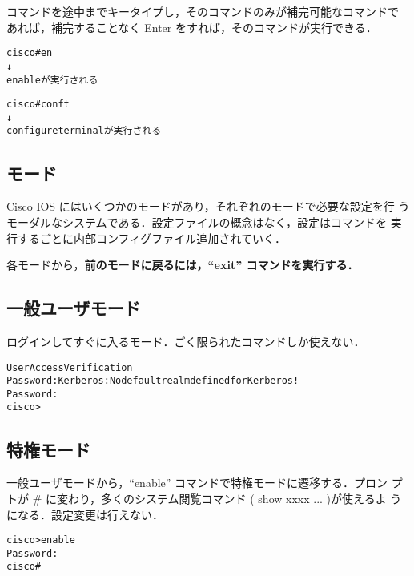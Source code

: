 コマンドを途中までキータイプし，そのコマンドのみが補完可能なコマンドで
あれば，補完することなく Enter をすれば，そのコマンドが実行できる．

\begin{center}
\begin{screen}
\begin{alltt}
cisco#en
       ↓
    enableが実行される

cisco#conf t
       ↓
   configure terminal が実行される
\end{alltt}
\end{screen}
\end{center}

\subsection*{モード}

Cisco IOS にはいくつかのモードがあり，それぞれのモードで必要な設定を行
うモーダルなシステムである．設定ファイルの概念はなく，設定はコマンドを
実行するごとに内部コンフィグファイル追加されていく．

各モードから，\textbf{前のモードに戻るには，``exit'' コマンドを実行する．}

\subsection*{一般ユーザモード}

ログインしてすぐに入るモード．ごく限られたコマンドしか使えない．

\begin{center}
\begin{screen}
\begin{alltt}
User Access Verification
Password: Kerberos:     No default realm defined for Kerberos!
Password:
cisco>
\end{alltt}
\end{screen}
\end{center}

\subsection*{特権モード}

一般ユーザモードから，``enable'' コマンドで特権モードに遷移する．プロン
プトが \# に変わり，多くのシステム閲覧コマンド ( show xxxx ... )が使えるよ
うになる．設定変更は行えない．

\begin{center}
\begin{screen}
\begin{alltt}
cisco>enable
Password:
cisco#
\end{alltt}
\end{screen}
\end{center}

